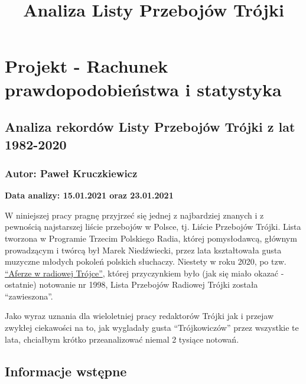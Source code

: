 \documentclass[11pt]{article}
\title{Analiza Listy Przebojów Trójki}
\begin{document}
    
    \maketitle
    
    

    
    \hypertarget{projekt---rachunek-prawdopodobieux144stwa-i-statystyka}{%
\section{Projekt - Rachunek prawdopodobieństwa i
statystyka}\label{projekt---rachunek-prawdopodobieux144stwa-i-statystyka}}

\hypertarget{analiza-rekorduxf3w-listy-przebojuxf3w-truxf3jki-z-lat-1982-2020}{%
\subsection{Analiza rekordów Listy Przebojów Trójki z lat
1982-2020}\label{analiza-rekorduxf3w-listy-przebojuxf3w-truxf3jki-z-lat-1982-2020}}

\hypertarget{autor-paweux142-kruczkiewicz}{%
\subsubsection{Autor: Paweł
Kruczkiewicz}\label{autor-paweux142-kruczkiewicz}}

\textbf{Data analizy: 15.01.2021 oraz 23.01.2021}

    W niniejszej pracy pragnę przyjrzeć się jednej z najbardziej znanych i z
pewnością najstarszej liście przebojów w Polsce, tj. Liście Przebojów
Trójki. Lista tworzona w Programie Trzecim Polskiego Radia, której
pomysłodawcą, głównym prowadzącym i twórcą był Marek Niedźwiecki, przez
lata kształtowała gusta muzyczne młodych pokoleń polskich słuchaczy.
Niestety w roku 2020, po tzw.
\href{https://pl.wikipedia.org/wiki/Polskie_Radio_Program_III\#Sprawa_pojawienia_si\%C4\%99_piosenki_\%E2\%80\%9ETw\%C3\%B3j_b\%C3\%B3l_jest_lepszy_ni\%C5\%BC_m\%C3\%B3j\%E2\%80\%9D_na_Li\%C5\%9Bcie_Przeboj\%C3\%B3w}{``Aferze
w radiowej Trójce''}, której przyczynkiem było (jak się miało okazać -
ostatnie) notowanie nr 1998, Lista Przebojów Radiowej Trójki została
``zawieszona''.

Jako wyraz uznania dla wieloletniej pracy redaktorów Trójki jak i
przejaw zwykłej ciekawości na to, jak wygladały gusta ``Trójkowiczów''
przez wszystkie te lata, chciałbym krótko przeanalizować niemal 2
tysiące notowań.

    \hypertarget{informacje-wstux119pne}{%
\subsection{Informacje wstępne}\label{informacje-wstux119pne}}
\end{document}
